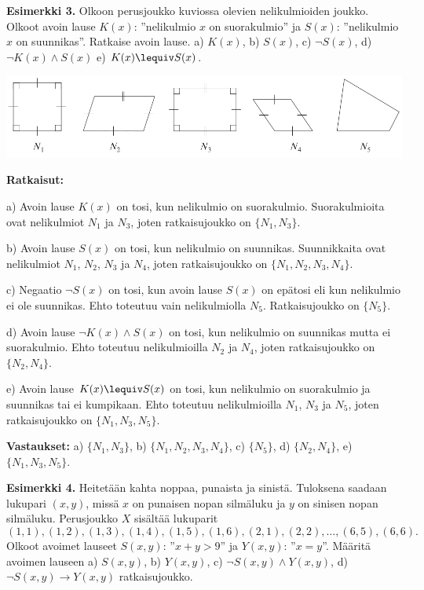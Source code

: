 {\bf Esimerkki 3.} Olkoon perusjoukko kuviossa olevien nelikulmioiden joukko. Olkoot avoin lause $K(x)$: ''nelikulmio $x$ on suorakulmio'' ja $S(x)$: ''nelikulmio $x$ on suunnikas''. Ratkaise avoin lause.  a)  $K(x)$,  b)  $S(x)$,  c) $\lnot S(x)$,  d)  $\lnot K(x) \land S(x)$  e)  $K(x) \lequiv S(x)$.

\begin{center}
\includegraphics[width=14cm]{kuvat/kpl3_2_esim3}
\end{center}


{\bf Ratkaisut:}

a) Avoin lause $K(x)$ on tosi, kun nelikulmio on suorakulmio. Suorakulmioita ovat nelikulmiot $N_1$ ja $N_3$, joten ratkaisujoukko on $\{ N_1, N_3\}$.

b) Avoin lause $S(x)$ on tosi, kun nelikulmio on suunnikas. Suunnikkaita ovat nelikulmiot $N_1$, $N_2$, $N_3$ ja $N_4$, joten ratkaisujoukko on $\{ N_1, N_2, N_3, N_4\}$.

c) Negaatio $\lnot S(x)$ on tosi, kun avoin lause $S(x)$ on epätosi eli kun nelikulmio ei ole suunnikas. Ehto toteutuu vain nelikulmiolla $N_5$. Ratkaisujoukko on $\{N_5\}$.

d) Avoin lause $\lnot K(x) \land S(x)$ on tosi, kun nelikulmio on suunnikas mutta ei suorakulmio. Ehto toteutuu nelikulmioilla $N_2$ ja $N_4$, joten ratkaisujoukko on $\{ N_2, N_4\}$.

e) Avoin lause $K(x) \lequiv S(x)$ on tosi, kun nelikulmio on suorakulmio ja suunnikas tai ei kumpikaan. Ehto toteutuu nelikulmioilla $N_1$, $N_3$ ja $N_5$, joten ratkaisujoukko on $\{ N_1, N_3, N_5\}$.

{\bf Vastaukset:}   a)  $\{ N_1, N_3\}$,   b)  $\{ N_1, N_2, N_3, N_4\}$,   c)  $\{N_5\}$,  d)  $\{ N_2, N_4\}$,  e)  $\{ N_1, N_3, N_5\}$.


{\bf Esimerkki 4.} Heitetään kahta noppaa, punaista ja sinistä. Tuloksena saadaan lukupari $(x, y)$, missä $x$ on punaisen nopan silmäluku ja $y$ on sinisen nopan silmäluku. Perusjoukko $X$ sisältää lukuparit
\[
(1, 1), (1, 2), (1, 3), (1, 4), (1, 5), (1, 6), (2, 1), (2, 2),\ldots , (6, 5), (6, 6).
\]
Olkoot avoimet lauseet $S(x,y)$: ''$x + y > 9$'' ja $Y(x,y)$: ''$x = y$''. Määritä avoimen lauseen a) $S(x,y)$, b) $Y(x,y)$, c) $\lnot S(x,y) \land Y(x,y)$, d) $\lnot S(x,y) \to Y(x,y)$ ratkaisujoukko.

